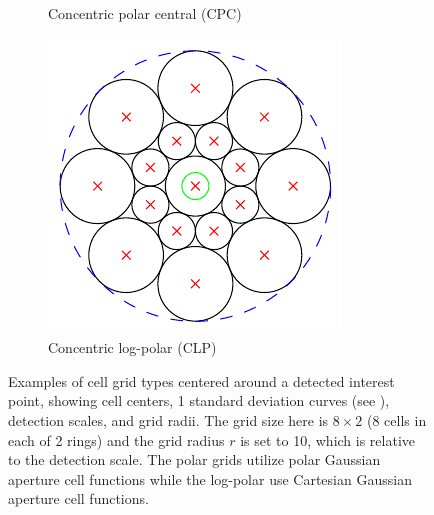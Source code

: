 \documentclass[thesis.tex]{subfiles}
\begin{document}
\begin{figure}[p]
\begin{subfigure}[t]{0.32\textwidth}
		\caption{Concentric polar central (CPC)}
		\label{fig:gridTypeCpc}
	\end{subfigure}
	\begin{subfigure}[t]{0.32\textwidth}
		\includegraphics[width=\textwidth]{img/gridType_concentric_log-polar.pdf}
		\caption{Concentric log-polar (CLP)}
		\label{fig:gridTypeClp}
	\end{subfigure}
	\caption{Examples of cell grid types centered around a detected interest point, showing cell centers, 1 standard deviation curves (see ), detection scales, and grid radii. The grid size here is $8 \times 2$ (8 cells in each of 2 rings) and the grid radius $r$ is set to 10, which is relative to the detection scale. The polar grids utilize polar Gaussian aperture cell functions while the log-polar use Cartesian Gaussian aperture cell functions.}
	\label{fig:gridType}
\end{figure}
%
\end{document}
